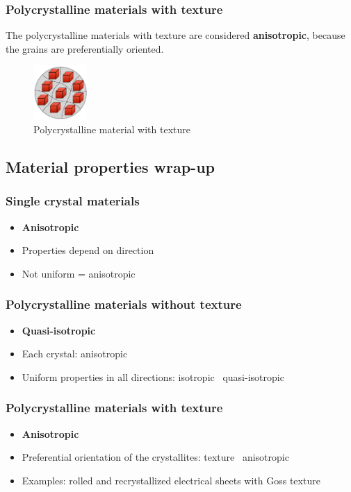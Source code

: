 \documentclass{article}
\begin{document}
\subsubsection{Polycrystalline materials with texture}
The polycrystalline materials with texture are considered \textbf{anisotropic},
because the grains are preferentially oriented.
\begin{figure}[ht!]
  \centering
  \includegraphics[width=0.1825\textwidth]{media/poly_texture.png}
  \caption*{Polycrystalline material with texture}
\end{figure}
\newpage

\subsection{Material properties wrap-up}
\subsubsection{Single crystal materials}
\begin{itemize}
  \item \textbf{Anisotropic}
  \item Properties depend on direction
  \item Not uniform = anisotropic
\end{itemize}

\subsubsection{Polycrystalline materials without texture}
\begin{itemize}
  \item \textbf{Quasi-isotropic}
  \item Each crystal: anisotropic
  \item Uniform properties in all directions: isotropic \textrightarrow\ quasi-isotropic
\end{itemize}

\subsubsection{Polycrystalline materials with texture}
\begin{itemize}
  \item \textbf{Anisotropic}
  \item Preferential orientation of the crystallites: texture \textrightarrow\ anisotropic
  \item Examples: rolled and recrystallized electrical sheets with Goss texture
\end{itemize}
\end{document}
